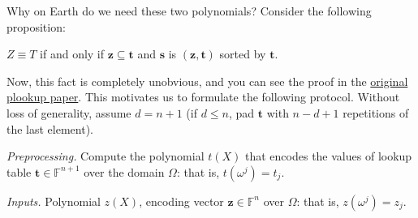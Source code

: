 \documentclass{lookup-template}
\begin{document}
Why on Earth do we need these two polynomials? Consider the following
proposition:

\begin{proposition}
    $Z \equiv T$ if and only if $\boldsymbol{z} \subseteq \boldsymbol{t}$ and
    $\boldsymbol{s}$ is $(\boldsymbol{z},\boldsymbol{t})$ sorted by
    $\boldsymbol{t}$.
\end{proposition}

Now, this fact is completely unobvious, and you can see the proof in the
\href{https://eprint.iacr.org/2020/315.pdf}{original plookup paper}. This
motivates us to formulate the following protocol. Without loss of generality,
assume $d=n+1$ (if $d \leq n$, pad $\boldsymbol{t}$ with $n-d+1$ repetitions of
the last element).

\textit{Preprocessing.} Compute the polynomial $t(X)$ that encodes the values of
lookup table $\boldsymbol{t} \in \mathbb{F}^{n+1}$ over the domain $\Omega$:
that is, $t(\omega^j)=t_j$. 

\textit{Inputs.} Polynomial $z(X)$, encoding vector $\boldsymbol{z} \in
\mathbb{F}^n$ over $\Omega$: that is, $z(\omega^j) = z_j$.
\end{document}
